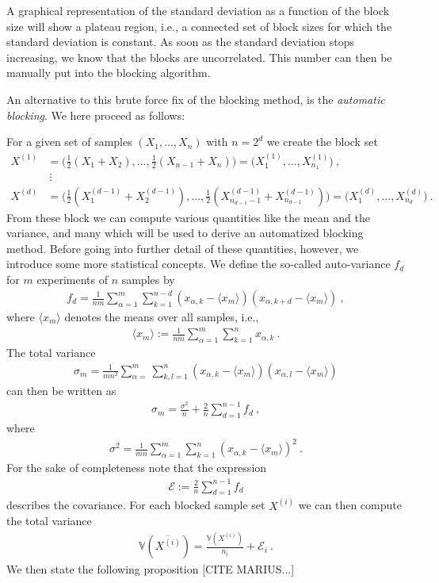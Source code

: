 \documentclass[11pt,a4paper]{article}
\numberwithin{equation}{section}
\begin{document}
A graphical representation of the standard deviation as a function of the block size will show a plateau region, i.e., a connected set of block sizes for which the standard deviation is constant. 
%
As soon as the standard deviation stops increasing, we know that the blocks are uncorrelated. 
%
This number can then be manually put into the blocking algorithm. 

% 
An alternative to this brute force fix of the blocking method, is the {\it automatic blocking}.
%
We here proceed as follows:

%
For a given set of samples $(X_1,...,X_n)$ with $n=2^d$ we create the block set
\begin{align*}
X^{(1)}&=\big(\frac{1}{2}(X_1+X_2),...,\frac{1}{2}(X_{n-1}+X_n)\big) = \big(X_1^{(1)},...,X_{n_1}^{(1)}\big)~,\\
&~\vdots\\
X^{(d)}&=\big(\frac{1}{2}(X_1^{(d-1)}+X_2^{(d-1)}),...,\frac{1}{2}(X_{n_{d-1}-1}^{(d-1)}+X_{n_{d-1}}^{(d-1)})\big) = \big(X_1^{(d)},...,X_{n_d}^{(d)}\big)~.
\end{align*} 
From these block we can compute various quantities like the mean and the variance, and many which will be used to derive an automatized blocking method. 
%
Before going into further detail of these quantities, however, we introduce some more statistical concepts.
%
We define the so-called auto-variance $f_d$ for $m$ experiments of $n$ samples by
\begin{align*}
f_d = \frac{1}{n m}\sum_{\alpha = 1}^{m}\sum_{k=1}^{n-d}(x_{\alpha,k}-\langle x_m\rangle)(x_{\alpha,k+d}-\langle x_m\rangle)~,
\end{align*} 
where $\langle x_m\rangle$ denotes the means over all samples, i.e.,
\begin{align*}
\langle x_m\rangle := \frac{1}{nm}\sum_{\alpha = 1}^{m}\sum_{k=1}^{n}x_{\alpha,k}~.
\end{align*}
The total variance
\begin{align*}
\sigma_m
=
\frac{1}{mn^2}\sum_{\alpha = }^{m}\sum_{k,l = 1}^{n}(x_{\alpha,k}-\langle x_m\rangle)(x_{\alpha,l}-\langle x_m\rangle)
\end{align*}
can then be written as
\begin{align*}
\sigma_m
=
\frac{\sigma^2}{n}
+
\frac{2}{n}\sum_{d = 1}^{n-1}f_d~,
\end{align*}
where 
\begin{align*}
\sigma^2
=
\frac{1}{mn}\sum_{\alpha=1}^{m}\sum_{k=1}^{n}(x_{\alpha,k}-\langle x_m\rangle)^2~.
\end{align*}
For the sake of completeness note that the expression 
\begin{align*}
\mathcal{E} :=\frac{2}{n}\sum_{d = 1}^{n-1}f_d
\end{align*}
describes the covariance.
%
For each blocked sample set $X^{(i)}$ we can then compute the total variance
\begin{align*}
\mathbb{V}(\overline{X^{(i)}})
=
\frac{\mathbb{V}(X^{(i)})}{n_i}+\mathcal{E}_i~.
\end{align*}
We then state the following proposition [CITE MARIUS...]\\
\end{document}

